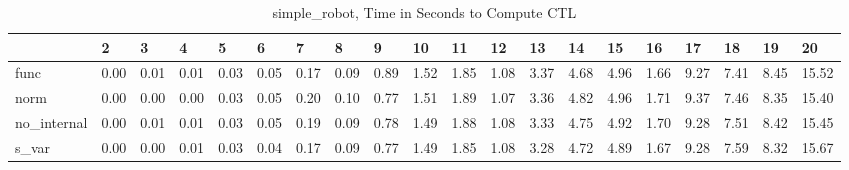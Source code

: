 \begin{table}
\centering
\caption{simple_robot, Time in Seconds to Compute CTL}
\label{simple_robot_CTL_time}
\begin{tabular}{llllllllllllllllllll}
\toprule
{} &     2 &     3 &     4 &     5 &     6 &     7 &     8 &     9 &    10 &    11 &    12 &    13 &    14 &    15 &    16 &    17 &    18 &    19 &     20 \\
\midrule
func        &  0.00 &  0.01 &  0.01 &  0.03 &  0.05 &  0.17 &  0.09 &  0.89 &  1.52 &  1.85 &  1.08 &  3.37 &  4.68 &  4.96 &  1.66 &  9.27 &  7.41 &  8.45 &  15.52 \\
norm        &  0.00 &  0.00 &  0.00 &  0.03 &  0.05 &  0.20 &  0.10 &  0.77 &  1.51 &  1.89 &  1.07 &  3.36 &  4.82 &  4.96 &  1.71 &  9.37 &  7.46 &  8.35 &  15.40 \\
no\_internal &  0.00 &  0.01 &  0.01 &  0.03 &  0.05 &  0.19 &  0.09 &  0.78 &  1.49 &  1.88 &  1.08 &  3.33 &  4.75 &  4.92 &  1.70 &  9.28 &  7.51 &  8.42 &  15.45 \\
s\_var       &  0.00 &  0.00 &  0.01 &  0.03 &  0.04 &  0.17 &  0.09 &  0.77 &  1.49 &  1.85 &  1.08 &  3.28 &  4.72 &  4.89 &  1.67 &  9.28 &  7.59 &  8.32 &  15.67 \\
\bottomrule
\end{tabular}
\end{table}
